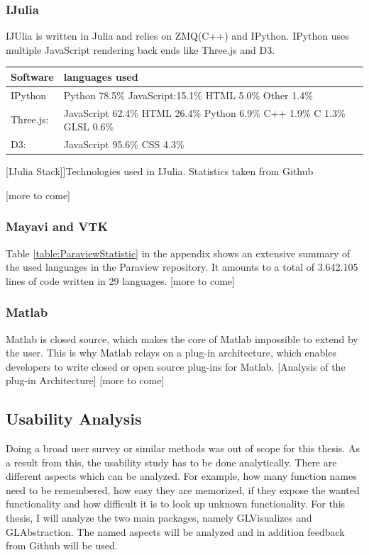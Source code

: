 \subsubsection{IJulia}

IJUlia is written in Julia and relies on ZMQ(C++) and IPython. 
IPython uses multiple JavaScript rendering back ends like Three.js and D3.
\begin{table}[htbp]
    \centering
    \begin{tabular}{l|l}
        \hline
        \textbf{Software} & \textbf{languages used}\\
        \hline
        IPython     & Python 78.5\% JavaScript:15.1\% HTML 5.0\% Other 1.4\%\\
        Three.js:   & JavaScript 62.4\% HTML 26.4\% Python 6.9\% C++ 1.9\% C 1.3\% GLSL 0.6\%\\
        D3:         & JavaScript 95.6\% CSS 4.3\%\\
        \hline
        \end{tabular}
    [IJulia Stack]]{Technologies used in IJulia. Statistics taken from Github}
    \label{table:ijuliastack}
\end{table}
[more to come]

\subsubsection{Mayavi and VTK}

Table \ref{table:ParaviewStatistic} in the appendix shows an extensive summary of the used languages in the Paraview repository.
It amounts to a total of 3.642.105 lines of code written in 29 languages.
[more to come]

\subsubsection{Matlab}

Matlab is closed source, which makes the core of Matlab impossible to extend by the user.
This is why Matlab relays on a plug-in architecture, which enables developers to write closed or open source plug-ins for Matlab.
[Analysis of the plug-in Architecture]
[more to come]


\subsection{Usability Analysis}
Doing a broad user survey or similar methods was out of scope for this thesis.
As a result from this, the usability study has to be done analytically.
There are different aspects which can be analyzed. For example, how many function names need to be remembered, how easy they are memorized, if they expose the wanted functionality and how difficult it is to look up unknown functionality.
For this thesis, I will analyze the two main packages, namely GLVisualizes and GLAbstraction. 
The named aspects will be analyzed and in addition feedback from Github will be used.

